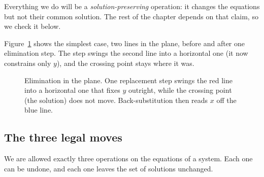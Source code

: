 Everything we do will be a \emph{solution-preserving} operation: it changes the
equations but not their common solution. The rest of the chapter depends on that
claim, so we check it below.

Figure~\ref{ch07:two-lines} shows the simplest case, two lines in the plane,
before and after one elimination step. The step swings the second
line into a horizontal one (it now constrains only $y$), and the crossing point
stays where it was.

\begin{figure}[H]
\centering
{}
\caption{Elimination in the plane. One replacement step swings the red line into
a horizontal one that fixes $y$ outright, while the crossing point (the solution)
does not move. Back-substitution then reads $x$ off the blue line.}
\label{ch07:two-lines}
\end{figure}

\subsection{The three legal moves}

We are allowed exactly three operations on the equations of a system. Each one
can be undone, and each one leaves the set of solutions unchanged.


